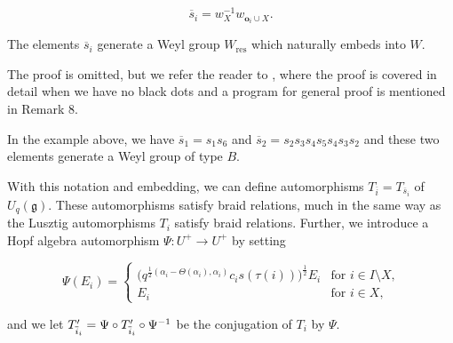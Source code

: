 \documentclass[a4 paper, 10pt]{article}
\begin{document}
\begin{equation}
	\overline{s}_i = w_{X}^{-1} w_{\textbf{o}_i \cup X}.
\end{equation}

\begin{proposition}
The elements $\overline{s}_i$ generate a Weyl group $W_{\text{res}}$ which naturally embeds into $W$.
\end{proposition}

The proof is omitted, but we refer the reader to \cite{a-GI14}, where the proof is covered in detail when we have no black dots and a program for general proof is mentioned in Remark 8. 



In the example above, we have $\overline{s}_1 = s_1s_6$ and $\overline{s}_2 = s_2s_3s_4s_5s_4s_3s_2$ and these two elements generate a Weyl group of type $B$. 


With this notation and embedding, we can define automorphisms $T_{\overline{i}} = T_{\overline{s}_i}$ of $U_q(\mathfrak{g})$. These automorphisms satisfy braid relations, much in the same way as the Lusztig automorphisms $T_i$ satisfy braid relations.
Further, we introduce a Hopf algebra automorphism $\Psi : U^{+} \rightarrow U^{+}$ by setting


\begin{equation}
	\Psi(E_i) = \begin{cases}	\big( q^{\frac{1}{2}(\alpha_i - \Theta(\alpha_i), \alpha_i)} c_is(\tau(i)) \big)^{\frac{1}{2}} E_i	& \mbox{for $i \in I \setminus X$,} \\
								E_i																									& \mbox{for $i \in X$,}
				\end{cases}
\end{equation}
\vspace{5pt}

\noindent and we let $T^{\prime}_{\overline{i}_{i}} = \Psi \circ T^{\prime}_{\overline{i}_{i}} \circ \Psi^{-1}$ be the conjugation of $T_i$ by $\Psi$.
\end{document}
